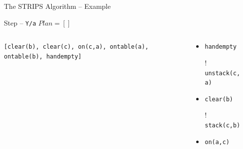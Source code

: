 \documentclass[presentation]{beamer}\mode<presentation>{\usetheme{AMSBolognaFC}}
\begin{document}
\begin{frame}[c]{The STRIPS Algorithm -- Example}
\small

    \begin{exampleblock}{Step \nextStripsExampleStep{} -- \texttt{Y/a} \hfill $Plan = []$}
        \begin{columns}[t]
            \begin{column}{.30\linewidth}\centering
                \texttt{[clear(b), clear(c), on(c,a), ontable(a), ontable(b), \alert{handempty}]}
            \end{column}
            \begin{column}{.50\linewidth}\centering
                \begin{itemize}
                    \item \alert{\texttt{handempty}}
                    \item[!] \texttt{unstack(c, a)}
                    \item \texttt{clear(b)}
                    \item[!] \texttt{stack(c,b)}
                    \item \texttt{on(a,c)}
                \end{itemize}
            \end{column}
            \begin{column}{.10\linewidth}\centering
                
            \end{column}
        \end{columns}
    \end{exampleblock}

\end{frame}
\end{document}
